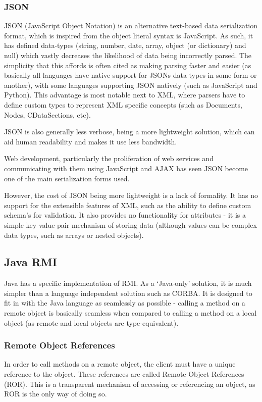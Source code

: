 \documentclass{article}
\begin{document}
\subsubsection{JSON}
JSON (JavaScript Object Notation) is an alternative text-based data serialization format, which is inspired from the object literal syntax is JavaScript. As such, it has defined data-types (string, number, date, array, object (or dictionary) and null) which vastly decreases the likelihood of data being incorrectly parsed. The simplicity that this affords is often cited as making parsing faster and easier (as basically all languages have native support for JSONs data types in some form or another), with some languages supporting JSON natively (such as JavaScript and Python). This advantage is most notable next to XML, where parsers have to define custom types to represent XML specific concepts (such as Documents, Nodes, CDataSections, etc).

JSON is also generally less verbose, being a more lightweight solution, which can aid human readability and makes it use less bandwidth.

Web development, particularly the proliferation of web services and communicating with them using JavaScript and AJAX has seen JSON become one of the main serialization forms used.

However, the cost of JSON being more lightweight is a lack of formality. It has no support for the extensible features of XML, such as the ability to define custom schema's for validation. It also provides no functionality for attributes - it is a simple key-value pair mechanism of storing data (although values can be complex data types, such as arrays or nested objects).

\subsection{Java RMI}
Java has a specific implementation of RMI. As a `Java-only' solution, it is much simpler than a language independent solution such as CORBA. It is designed to fit in with the Java language as seamlessly as possible - calling a method on a remote object is basically seamless when compared to calling a method on a local object (as remote and local objects are type-equivalent). 

\subsubsection{Remote Object References}
In order to call methods on a remote object, the client must have a unique reference to the object. These references are called Remote Object References (ROR). This is a transparent mechanism of accessing or referencing an object, as ROR is the only way of doing so. 
\end{document}

